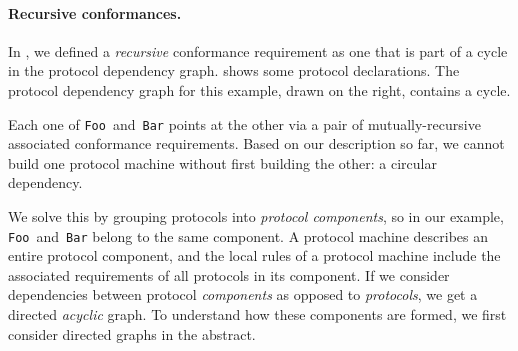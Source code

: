 \documentclass[../generics]{subfiles}
\begin{document}
\begin{figure}
\end{figure}

\paragraph{Recursive conformances.}
In , we defined a \emph{recursive} conformance requirement as one that is part of a cycle in the protocol dependency graph.  shows some protocol declarations. The protocol dependency graph for this example, drawn on the right, contains a cycle.

Each one of \texttt{Foo}~and~\texttt{Bar} points at the other via a pair of mutually-recursive associated conformance requirements. Based on our description so far, we cannot build one protocol machine without first building the other: a circular dependency.

We solve this by grouping protocols into \emph{protocol components}, so in our example, \texttt{Foo}~and~\texttt{Bar} belong to the same component. A protocol machine describes an entire protocol component, and the local rules of a protocol machine include the associated requirements of all protocols in its component. If we consider dependencies between protocol \emph{components} as opposed to \emph{protocols}, we get a directed \emph{acyclic} graph. To understand how these components are formed, we first consider directed graphs in the abstract.
\end{document}
